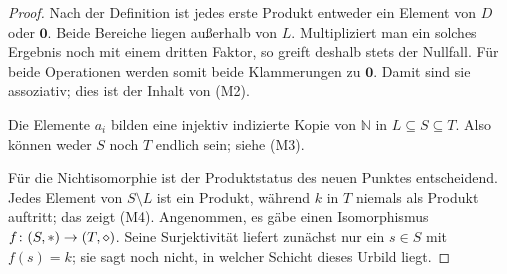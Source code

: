 \documentclass[main.tex]{subfiles}
\begin{document}
\begin{proof}
Nach der Definition ist jedes erste Produkt entweder ein Element von \(D\)
oder \(\mathbf0\). Beide Bereiche liegen außerhalb von \(L\). Multipliziert
man ein solches Ergebnis noch mit einem dritten Faktor, so greift deshalb
stets der Nullfall. Für beide Operationen werden somit beide Klammerungen zu
\(\mathbf0\). Damit sind sie assoziativ; dies ist der Inhalt von
\textup{(M2)}.

Die Elemente \(a_i\) bilden eine injektiv indizierte Kopie von
\(\mathbb N\) in \(L\subseteq S\subseteq T\). Also können weder \(S\) noch
\(T\) endlich sein; siehe \textup{(M3)}.

Für die Nichtisomorphie ist der Produktstatus des neuen Punktes entscheidend.
Jedes Element von \(S\setminus L\) ist ein Produkt, während \(k\) in \(T\)
niemals als Produkt auftritt; das zeigt \textup{(M4)}. Angenommen, es gäbe
einen Isomorphismus
\(f\colon(S,\mathbin{\ast})\to(T,\mathbin{\diamond})\). Seine Surjektivität liefert
zunächst nur ein \(s\in S\) mit \(f(s)=k\); sie sagt noch nicht, in welcher
Schicht dieses Urbild liegt.


\end{proof}
\end{document}
